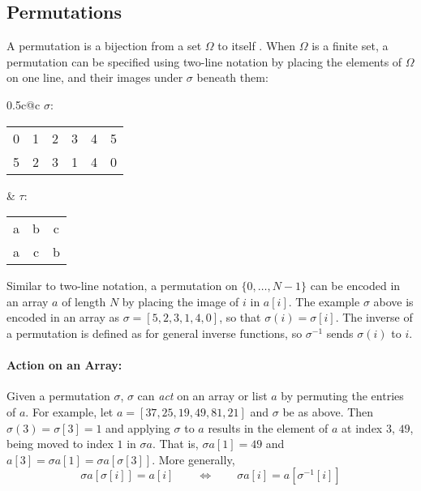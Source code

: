 \documentclass{llncs}
\begin{document}
  \subsection{Permutations}
  \label{perms}

    A permutation is a bijection from a set \(\Omega\) to itself \cite{dummitfoote}.
    When \(\Omega\) is a finite set, a permutation can be specified using two-line
    notation by placing the elements of \(\Omega\) on one line, and their images
    under \(\sigma\) beneath them:

    \begin{center}
    \begin{tabular*}{0.5\textwidth}{c@{\extracolsep{\fill}}c}
    \(\sigma\):
    \begin{tabular}{c@{\hspace{1em}}c@{\hspace{1em}}c@{\hspace{1em}}c@{\hspace{1em}}c@{\hspace{1em}}c}
    0 & 1 & 2 & 3 & 4 & 5\\
    5 & 2 & 3 & 1 & 4 & 0
    \end{tabular}
    &
    \(\tau\):
    \begin{tabular}{c@{\hspace{1em}}c@{\hspace{1em}}c}
    a & b & c\\
    a & c & b
    \end{tabular}
    \end{tabular*}
    \end{center}

    Similar to two-line notation, a permutation on \(\{0, \dotsc, N-1\}\) can be
    encoded in an array \(a\) of length \(N\) by placing the image of \(i\) in
    \(a[i]\).  The example \(\sigma\) above is encoded in an array as \(\sigma = [5,
    2, 3, 1, 4, 0]\), so that \(\sigma(i) = \sigma[i]\).
    The inverse of a permutation is defined as for general inverse functions,
    so $\sigma^{-1}$ sends $\sigma(i)$ to $i$.

  \paragraph{Action on an Array:}

    Given a permutation \(\sigma\), \(\sigma\) can {\it act} on an array or list \(a\)
    by permuting the entries of $a$.
    For example, let \(a = [37, 25, 19, 49, 81, 21]\) and \(\sigma\) be as above.  
    Then \(\sigma(3) = \sigma[3] = 1\) and applying \(\sigma\) to \(a\) results in the
    element of \(a\) at index \(3\), \(49\), being moved to index \(1\) in \(\sigma
    a\).  That is, \(\sigma a[1] = 49\) and \(a[3] = \sigma a[1] = \sigma
    a[\sigma[3]]\).  More generally,
    \begin{equation}
    \sigma a[\sigma[i]] = a[i] \qquad 
      \Longleftrightarrow \qquad \sigma a[i] = a[\sigma^{-1}[i]]
    \label{action}
    \end{equation}
\end{document}
